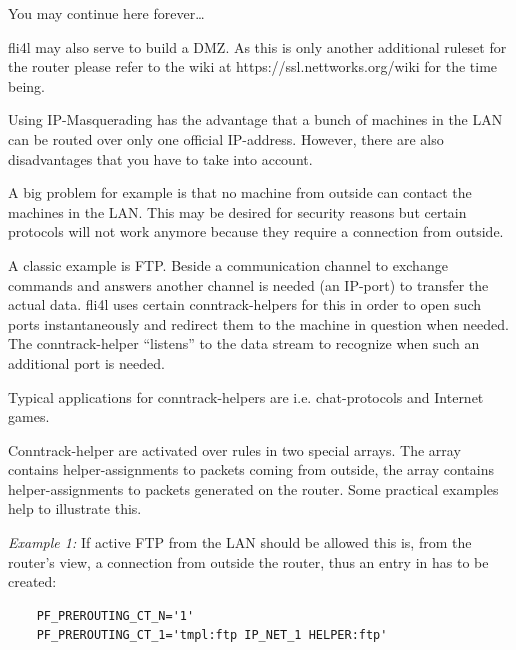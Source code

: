 You may continue here forever\ldots


fli4l may also serve to build a DMZ. As this is only another additional
ruleset for the router please refer to the wiki at
https://ssl.nettworks.org/wiki for the time being.


  Using IP-Masquerading has the advantage
  that a bunch of machines in the LAN can be routed over only one
  official IP-address. However, there are also disadvantages that
  you have to take into account.

  A big problem for example is that no machine from outside can
  contact the machines in the LAN. This may be desired for security
  reasons but certain protocols will not work anymore because they
  require a connection from outside.

  A classic example is FTP. Beside a communication channel to exchange
  commands and answers another channel is needed (an IP-port) to
  transfer the actual data. fli4l uses certain conntrack-helpers for
  this in order to open such ports instantaneously and redirect them
  to the machine in question when needed. The conntrack-helper
  ``listens'' to the data stream to recognize when such an additional
  port is needed.

  Typical applications for conntrack-helpers are i.e. chat-protocols and
  Internet games.

  Conntrack-helper are activated over rules in two special arrays.
  The array  contains helper-assignments
  to packets coming from outside, the array 
  contains helper-assignments to packets generated on the router.
  Some practical examples help to illustrate this.
  
  \emph{Example 1:} If active FTP from the LAN should be allowed this is, 
  from the router's view, a connection from outside the router, thus an
  entry in  has to be created:
  
\begin{example}
\begin{verbatim}
    PF_PREROUTING_CT_N='1'
    PF_PREROUTING_CT_1='tmpl:ftp IP_NET_1 HELPER:ftp'
\end{verbatim}
\end{example}

